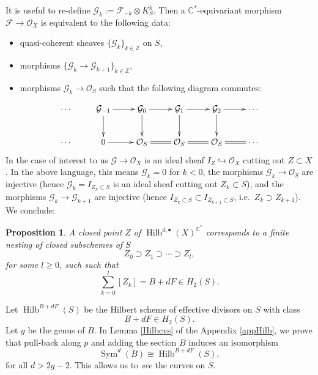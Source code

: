 \documentclass{amsart}
\newtheorem{proposition}[theorem]{Proposition}
\theoremstyle{definition}
\newcommand{\CC} {\mathbb{C}}          %
\newcommand{\ZZ} {\mathbb{Z}}		%
\renewcommand{\O}{\mathcal{O}}
\newcommand{\Sym}{\operatorname{Sym}}
\newcommand{\Hilb}{\operatorname{Hilb}}
\newcommand{\F}{\mathcal{F}}
\newcommand{\G}{\mathcal{G}}
\begin{document}
It is useful to re-define $\G_k := \F_{-k} \otimes K_{S}^{k}$. Then a $\CC^*$-equivariant morphism $\F \rightarrow \O_X$ is equivalent to the following data:
\begin{itemize}
\item quasi-coherent sheaves $\{\G_k\}_{k \in \ZZ}$ on $S$,
\item morphisms $\{\G_k \rightarrow \G_{k+1}\}_{k \in \ZZ}$,
\item morphisms $\G_k \rightarrow \O_S$ such that the following diagram commutes:
\end{itemize}
\begin{displaymath}
\xymatrix
{
\cdots & \G_{-1} \ar[d] \ar[r] & \G_0 \ar[r] \ar[d] & \G_{1} \ar[r] \ar[d] & \G_{2} \ar[r] \ar[d] & \cdots \\
\cdots & 0 \ar[r] & \O_S \ar@{=}[r]& \O_S \ar@{=}[r] & \O_S \ar@{=}[r] & \cdots 
}
\end{displaymath}
In the case of interest to us $\G \rightarrow \O_X$ is an ideal sheaf $I_Z \hookrightarrow \O_X$ cutting out $Z \subset X$. In the above language, this means $\G_k = 0$ for $k<0$, the morphisms $\G_k \rightarrow \O_S$ are injective (hence $\G_k = I_{Z_k \subset S}$ is an ideal sheaf cutting out $Z_k \subset S$), and the morphisms $\G_k \rightarrow \G_{k+1}$ are injective (hence $I_{Z_k \subset S} \subset I_{Z_{k+1} \subset S}$, i.e.~$Z_{k} \supset Z_{k+1}$). We conclude:
\begin{proposition} \label{nest}
A closed point $Z$ of $\Hilb^{d,\bullet}(X)^{\CC^*}$ corresponds to a finite nesting of closed subschemes of $S$
$$
Z_{0} \supset Z_{1} \supset \cdots \supset Z_{l},
$$
for some $l \geq 0$, such such that
$$
\sum_{k=0}^{l} [Z_k] = B + dF \in H_2(S).
$$
\end{proposition}
Let $\Hilb^{B+dF}(S)$ be the Hilbert scheme of effective divisors on $S$ with class $$B+dF \in H_2(S).$$ Let $g$ be the genus of $B$. In Lemma \ref{Hilbcvs} of the Appendix \ref{appHilb}, we prove that pull-back along $p$ and adding the section $B$ induces an isomorphism
$$
\Sym^d(B) \cong \Hilb^{B+dF}(S),
$$
for all $d > 2g-2$. This allows us to \emph{see} the curves on $S$. 
\end{document}
